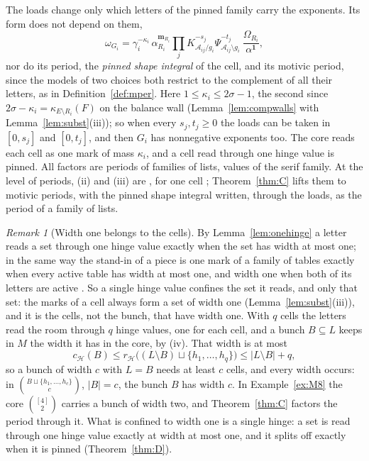\documentclass[11pt]{article}
\theoremstyle{plain}
\theoremstyle{definition}
\theoremstyle{remark}
\newtheorem{rem}[prop]{Remark}
\newcommand{\bm}{\mathbf m}
\begin{document}
The loads change only which letters of the pinned family carry the exponents. Its form does not depend on them,
\[
\omega_{G_i}=\gamma_i^{-\kappa_i}\,\alpha_{R_i}^{\bm_{R_i}}\prod_jK_{\mathcal A_{ij}/g_i}^{-s_j}\Psi_{\mathcal A_{ij}\setminus g_i}^{-t_j}\ \frac{\Omega_{R_i}}{\alpha^{\mathbf 1}},
\]
nor do its period, the \emph{pinned shape integral} of the cell, and its motivic period, since the models of two choices both restrict to the complement of all their letters, as in Definition~\ref{def:mper}. Here $1\le\kappa_i\le2\sigma-1$, the second since $2\sigma-\kappa_i=\kappa_{E\setminus R_i}(F)$ on the balance wall (Lemma~\ref{lem:compwalls} with Lemma~\ref{lem:subst}(iii)); so when every $s_j,t_j\ge0$ the loads can be taken in $[0,s_j]$ and $[0,t_j]$, and then $G_i$ has nonnegative exponents too. The core reads each cell as one mark of mass $\kappa_i$, and a cell read through one hinge value is pinned. All factors are periods of families of lists, values of the serif family. At the level of periods, (ii) and (iii) are \cite[Thm.~21.5, Cor.~21.6, p.~173]{F}, for one cell \cite[Thm.~18.10, p.~118; Prop.~18.12, p.~119]{F}; Theorem~\ref{thm:C} lifts them to motivic periods, with the pinned shape integral written, through the loads, as the period of a family of lists.

\begin{rem}[Width one belongs to the cells]\label{rem:whyone}
By Lemma~\ref{lem:onehinge} a letter reads a set through one hinge value exactly when the set has width at most one; in the same way the stand-in of a piece is one mark of a family of tables exactly when every active table has width at most one, and width one when both of its letters are active \cite[Thm.~27.22, p.~237]{F}. So a single hinge value confines the set it reads, and only that set: the marks of a cell always form a set of width one (Lemma~\ref{lem:subst}(iii)), and it is the cells, not the bunch, that have width one. With $q$ cells the letters read the room through $q$ hinge values, one for each cell, and a bunch $B\subseteq L$ keeps in $M$ the width it has in the core, by (iv). That width is at most
\[
c_{\mathcal H}(B)\le r_{\mathcal H}\big((L\setminus B)\sqcup\{h_1,\dots,h_q\}\big)\le|L\setminus B|+q,
\]
so a bunch of width $c$ with $L=B$ needs at least $c$ cells, and every width occurs: in $\binom{B\sqcup\{h_1,\dots,h_c\}}{c}$, $|B|=c$, the bunch $B$ has width $c$. In Example~\ref{ex:M8} the core $\binom{[4]}2$ carries a bunch of width two, and Theorem~\ref{thm:C} factors the period through it. What is confined to width one is a single hinge: a set is read through one hinge value exactly at width at most one, and it splits off exactly when it is pinned (Theorem~\ref{thm:D}).
\end{rem}
\end{document}
